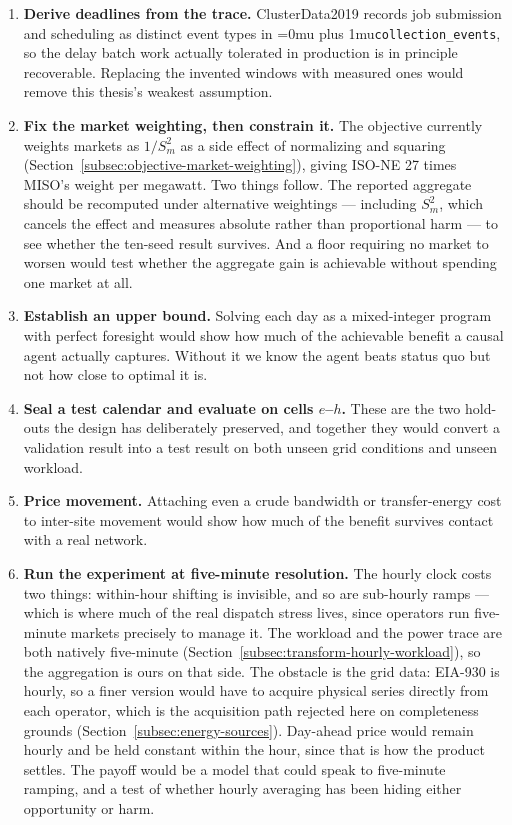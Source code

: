 ﻿\documentclass[12pt]{article}
\newcommand{\codepath}[1]{{\Urlmuskip=0mu plus 1mu\relax\nolinkurl{#1}}}
\begin{document}
\begin{enumerate}
  \item \textbf{Derive deadlines from the trace.} ClusterData2019 records job
        submission and scheduling as distinct event types in
        \codepath{collection_events}, so the delay batch work actually tolerated
        in production is in principle recoverable. Replacing the invented
        windows with measured ones would remove this thesis's weakest
        assumption.
  \item \textbf{Fix the market weighting, then constrain it.} The objective
        currently weights markets as \(1/S_m^{2}\) as a side effect of
        normalizing and squaring
        (Section~\ref{subsec:objective-market-weighting}), giving ISO-NE 27
        times MISO's weight per megawatt. Two things follow. The reported
        aggregate should be recomputed under alternative weightings ---
        including \(S_m^{2}\), which cancels the effect and measures absolute
        rather than proportional harm --- to see whether the ten-seed result
        survives. And a floor requiring no market to worsen would test whether
        the aggregate gain is achievable without spending one market at all.
  \item \textbf{Establish an upper bound.} Solving each day as a mixed-integer
        program with perfect foresight would show how much of the achievable
        benefit a causal agent actually captures. Without it we know the agent
        beats status quo but not how close to optimal it is.
  \item \textbf{Seal a test calendar and evaluate on cells \(e\)--\(h\).} These
        are the two hold-outs the design has deliberately preserved, and
        together they would convert a validation result into a test result on
        both unseen grid conditions and unseen workload.
  \item \textbf{Price movement.} Attaching even a crude bandwidth or
        transfer-energy cost to inter-site movement would show how much of the
        benefit survives contact with a real network.
  \item \textbf{Run the experiment at five-minute resolution.} The hourly clock
        costs two things: within-hour shifting is invisible, and so are
        sub-hourly ramps --- which is where much of the real dispatch stress
        lives, since operators run five-minute markets precisely to manage it.
        The workload and the power trace are both natively five-minute
        (Section~\ref{subsec:transform-hourly-workload}), so the aggregation is
        ours on that side. The obstacle is the grid data: EIA-930 is hourly, so
        a finer version would have to acquire physical series directly from each
        operator, which is the acquisition path rejected here on completeness
        grounds (Section~\ref{subsec:energy-sources}). Day-ahead price would
        remain hourly and be held constant within the hour, since that is how
        the product settles. The payoff would be a model that could speak to
        five-minute ramping, and a test of whether hourly averaging has been
        hiding either opportunity or harm.
\end{enumerate}
\end{document}
